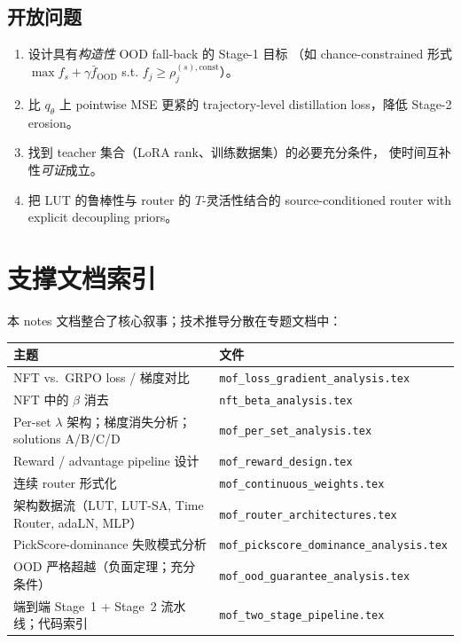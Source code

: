 \documentclass[11pt,a4paper]{article}
\newcommand{\OOD}{\mathrm{OOD}}
\newcommand{\const}{\mathrm{const}}
\theoremstyle{definition}
\begin{document}
\subsection{开放问题}
\begin{enumerate}[leftmargin=1.5em]
\item 设计具有\emph{构造性} OOD fall-back 的 Stage-1 目标
（如 chance-constrained 形式 $\max f_s + \gamma \bar f_{\OOD}$ s.t.\@
$f_j \geq \rho_j^{(s),\const}$）。
\item 比 $q_\theta$ 上 pointwise MSE 更紧的 trajectory-level
distillation loss，降低 Stage-2 erosion。
\item 找到 teacher 集合（LoRA rank、训练数据集）的必要充分条件，
使时间互补性\emph{可证}成立。
\item 把 LUT 的鲁棒性与 router 的 $T$-灵活性结合的 source-conditioned
router with explicit decoupling priors。
\end{enumerate}

\appendix
\section{支撑文档索引}
\label{app:supports}

本 notes 文档整合了核心叙事；技术推导分散在专题文档中：

\begin{center}
\renewcommand{\arraystretch}{1.4}
\footnotesize
\begin{tabular}{@{}p{5.5cm}p{8cm}@{}}
\toprule
\textbf{主题} & \textbf{文件} \\
\midrule
NFT vs.\ GRPO loss / 梯度对比 &
\texttt{mof\_loss\_gradient\_analysis.tex} \\
NFT 中的 $\beta$ 消去 &
\texttt{nft\_beta\_analysis.tex} \\
Per-set $\lambda$ 架构；梯度消失分析；
solutions A/B/C/D &
\texttt{mof\_per\_set\_analysis.tex} \\
Reward / advantage pipeline 设计 &
\texttt{mof\_reward\_design.tex} \\
连续 router 形式化 &
\texttt{mof\_continuous\_weights.tex} \\
架构数据流（LUT, LUT-SA, Time Router, adaLN, MLP）&
\texttt{mof\_router\_architectures.tex} \\
PickScore-dominance 失败模式分析 &
\texttt{mof\_pickscore\_dominance\_analysis.tex} \\
OOD 严格超越（负面定理；充分条件）&
\texttt{mof\_ood\_guarantee\_analysis.tex} \\
端到端 Stage~1 + Stage~2 流水线；代码索引 &
\texttt{mof\_two\_stage\_pipeline.tex} \\
\bottomrule
\end{tabular}
\end{center}
\end{document}
